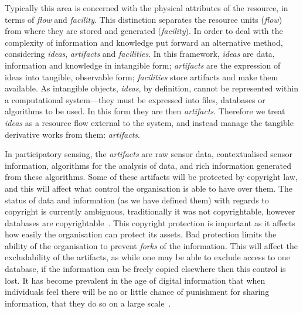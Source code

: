 Typically this area is concerned with the physical attributes of the resource, in terms of \emph{flow} and \emph{facility}. This distinction separates the resource units (\emph{flow}) from where they are stored and generated (\emph{facility}). In order to deal with the complexity of information and knowledge  put forward an alternative method, considering \emph{ideas}, \emph{artifacts} and \emph{facilities}. 
In this framework, \emph{ideas} are data, information and knowledge in intangible form; \emph{artifacts} are the expression of ideas into tangible, observable form; \emph{facilities} store artifacts and make them available. 
As intangible objects, \emph{ideas}, by definition, cannot be represented within a computational system---they must be expressed into files, databases or algorithms to be used. In this form they are then \emph{artifacts}. Therefore we treat \emph{ideas} as a resource flow external to the system, and instead manage the tangible derivative works from them: \emph{artifacts}.

In participatory sensing, the \emph{artifacts} are raw sensor data, contextualised sensor information, algorithms for the analysis of data, and rich information generated from these algorithms. Some of these artifacts will be protected by copyright law, and this will affect what control the organisation is able to have over them. The status of data and information (as we have defined them) with regards to copyright is currently ambiguous, traditionally it was not copyrightable, however databases are copyrightable~\citep{Miller2008}. This copyright protection is important as it affects how easily the organisation can protect its assets. Bad protection limits the ability of the organisation to prevent \emph{forks} of the information. This will affect the excludability of the artifacts, as while one may be able to exclude access to one database, if the information can be freely copied elsewhere then this control is lost. It has become prevalent in the age of digital information that when individuals feel there will be no or little chance of punishment for sharing information, that they do so on a large scale~\citep{Lessig2004}.

